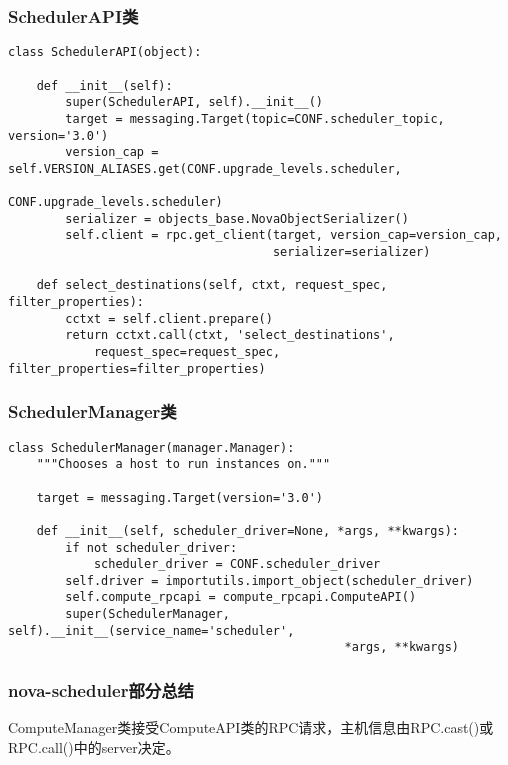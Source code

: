 \documentclass[a4paper,left=2.5cm,right=2.5cm,11pt]{article}
\begin{document}
\subsubsection{SchedulerAPI类}
    \begin{lstlisting}
class SchedulerAPI(object):
    
    def __init__(self):
        super(SchedulerAPI, self).__init__()
        target = messaging.Target(topic=CONF.scheduler_topic, version='3.0')
        version_cap = self.VERSION_ALIASES.get(CONF.upgrade_levels.scheduler,
                                               CONF.upgrade_levels.scheduler)
        serializer = objects_base.NovaObjectSerializer()
        self.client = rpc.get_client(target, version_cap=version_cap,
                                     serializer=serializer)

    def select_destinations(self, ctxt, request_spec, filter_properties):
        cctxt = self.client.prepare()
        return cctxt.call(ctxt, 'select_destinations',
            request_spec=request_spec, filter_properties=filter_properties)
    \end{lstlisting}

\subsubsection{SchedulerManager类}
    \begin{lstlisting}
class SchedulerManager(manager.Manager):
    """Chooses a host to run instances on."""

    target = messaging.Target(version='3.0')

    def __init__(self, scheduler_driver=None, *args, **kwargs):
        if not scheduler_driver:
            scheduler_driver = CONF.scheduler_driver
        self.driver = importutils.import_object(scheduler_driver)
        self.compute_rpcapi = compute_rpcapi.ComputeAPI()
        super(SchedulerManager, self).__init__(service_name='scheduler',
                                               *args, **kwargs)
    \end{lstlisting}

\subsubsection{nova-scheduler部分总结}
    ComputeManager类接受ComputeAPI类的RPC请求，主机信息由RPC.cast()或RPC.call()中的server决定。
\end{document}
